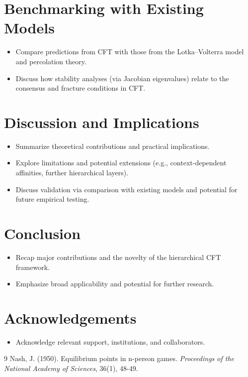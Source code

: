 \documentclass{article}
\begin{document}
\section{Benchmarking with Existing Models}
\begin{itemize}
  \item Compare predictions from CFT with those from the Lotka--Volterra model and percolation theory.
  \item Discuss how stability analyses (via Jacobian eigenvalues) relate to the consensus and fracture conditions in CFT.
\end{itemize}

\section{Discussion and Implications}
\begin{itemize}
  \item Summarize theoretical contributions and practical implications.
  \item Explore limitations and potential extensions (e.g., context-dependent affinities, further hierarchical layers).
  \item Discuss validation via comparison with existing models and potential for future empirical testing.
\end{itemize}

\section{Conclusion}
\begin{itemize}
  \item Recap major contributions and the novelty of the hierarchical CFT framework.
  \item Emphasize broad applicability and potential for further research.
\end{itemize}

\section*{Acknowledgements}
\begin{itemize}
  \item Acknowledge relevant support, institutions, and collaborators.
\end{itemize}

\begin{thebibliography}{9}
 Nash, J. (1950). Equilibrium points in n-person games. \emph{Proceedings of the National Academy of Sciences}, 36(1), 48-49.
\end{thebibliography}
\end{document}
